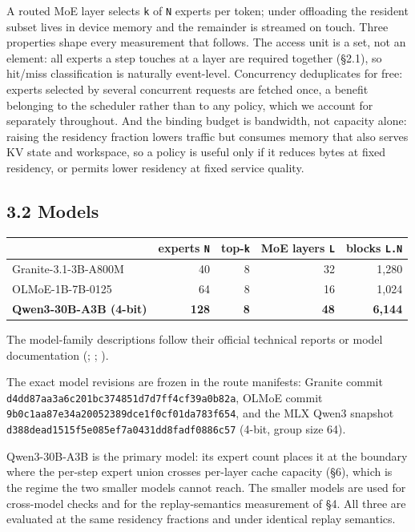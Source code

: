 \documentclass[
  10pt,
  letterpaper,
  10pt]{article}
\newcounter{none} %
\begin{document}
A routed MoE layer selects \texttt{k} of \texttt{N} experts per token;
under offloading the resident subset lives in device memory and the
remainder is streamed on touch. Three properties shape every measurement
that follows. The access unit is a set, not an element: all experts a
step touches at a layer are required together (§2.1), so hit/miss
classification is naturally event-level. Concurrency deduplicates for
free: experts selected by several concurrent requests are fetched once,
a benefit belonging to the scheduler rather than to any policy, which we
account for separately throughout. And the binding budget is bandwidth,
not capacity alone: raising the residency fraction lowers traffic but
consumes memory that also serves KV state and workspace, so a policy is
useful only if it reduces bytes at fixed residency, or permits lower
residency at fixed service quality.

\subsection{3.2 Models}\label{models}

{\def\LTcaptype{none} %
\begin{longtable}[]{@{}lrrrr@{}}
\toprule\noalign{}
& experts \texttt{N} & top-\texttt{k} & MoE layers \texttt{L} & blocks
\texttt{L.N} \\
\midrule\noalign{}
\endhead
\bottomrule\noalign{}
\endlastfoot
Granite-3.1-3B-A800M & 40 & 8 & 32 & 1,280 \\
OLMoE-1B-7B-0125 & 64 & 8 & 16 & 1,024 \\
\textbf{Qwen3-30B-A3B (4-bit)} & \textbf{128} & \textbf{8} & \textbf{48}
& \textbf{6,144} \\
\end{longtable}
}

The model-family descriptions follow their official technical reports or
model documentation (;
;
).

The exact model revisions are frozen in the route manifests: Granite
commit \texttt{d4dd87aa3a6c201bc374851d7d7ff4cf39a0b82a}, OLMoE commit
\texttt{9b0c1aa87e34a20052389dce1f0cf01da783f654}, and the MLX Qwen3
snapshot \texttt{d388dead1515f5e085ef7a0431dd8fadf0886c57} (4-bit, group
size 64).

Qwen3-30B-A3B is the primary model: its expert count places it at the
boundary where the per-step expert union crosses per-layer cache
capacity (§6), which is the regime the two smaller models cannot reach.
The smaller models are used for cross-model checks and for the
replay-semantics measurement of §4. All three are evaluated at the same
residency fractions and under identical replay semantics.
\end{document}
